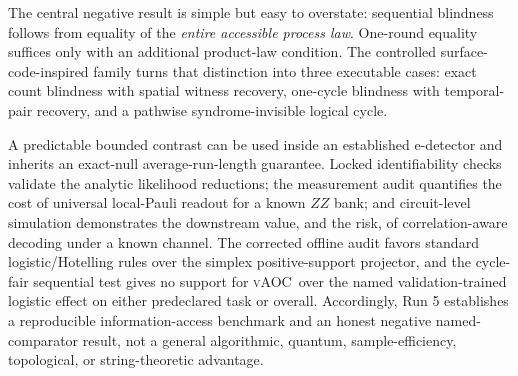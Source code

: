 \documentclass[letterpaper,journal]{IEEEtran}
\newcommand{\vAOC}{\textsc{vAOC}}
\begin{document}
The central negative result is simple but easy to overstate: sequential
blindness follows from equality of the \emph{entire accessible process law}.
One-round equality suffices only with an additional product-law condition.
The controlled surface-code-inspired family turns that distinction into
three executable cases: exact count blindness with spatial witness recovery,
one-cycle blindness with temporal-pair recovery, and a pathwise
syndrome-invisible logical cycle.

A predictable bounded contrast can be used inside an established e-detector
and inherits an exact-null average-run-length guarantee. Locked
identifiability checks validate the analytic likelihood reductions; the
measurement audit quantifies the cost of universal local-Pauli readout for a
known $ZZ$ bank; and circuit-level simulation demonstrates the downstream
value, and the risk, of correlation-aware decoding under a known channel.
The corrected offline audit favors standard logistic/Hotelling rules over the
simplex positive-support projector, and the cycle-fair sequential test gives
no support for \vAOC\ over the named validation-trained logistic effect on
either predeclared task or overall. Accordingly, Run 5 establishes a
reproducible information-access benchmark and an honest negative
named-comparator result, not a general algorithmic, quantum,
sample-efficiency, topological, or string-theoretic advantage.



\end{document}
